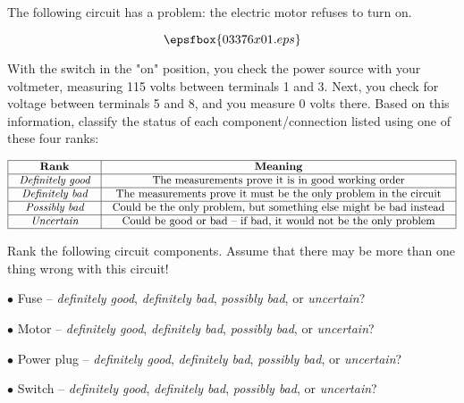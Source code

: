 

The following circuit has a problem: the electric motor refuses to turn on.

$$\epsfbox{03376x01.eps}$$

With the switch in the "on" position, you check the power source with your voltmeter, measuring 115 volts between terminals 1 and 3.  Next, you check for voltage between terminals 5 and 8, and you measure 0 volts there.  Based on this information, classify the status of each component/connection listed using one of these four ranks:


$$\vbox{\offinterlineskip
\halign{\strut
\vrule \quad\hfil # \ \hfil & 
\vrule \quad\hfil # \ \hfil \vrule \cr
\noalign{\hrule}
%
{\bf Rank} & {\bf Meaning} \cr
%
\noalign{\hrule}
%
{\it Definitely good} & The measurements prove it is in good working order \cr
%
\noalign{\hrule}
%
{\it Definitely bad} & The measurements prove it must be the only problem in the circuit \cr
%
\noalign{\hrule}
%
{\it Possibly bad} & Could be the only problem, but something else might be bad instead \cr
%
\noalign{\hrule}
%
{\it Uncertain} & Could be good or bad -- if bad, it would not be the only problem \cr
%
\noalign{\hrule}
} %
}$$ %

Rank the following circuit components.  Assume that there may be more than one thing wrong with this circuit!

\medskip
\item{$\bullet$} Fuse -- {\it definitely good}, {\it definitely bad}, {\it possibly bad}, or {\it uncertain}?
\item{$\bullet$} Motor -- {\it definitely good}, {\it definitely bad}, {\it possibly bad}, or {\it uncertain}?
\item{$\bullet$} Power plug -- {\it definitely good}, {\it definitely bad}, {\it possibly bad}, or {\it uncertain}?
\item{$\bullet$} Switch -- {\it definitely good}, {\it definitely bad}, {\it possibly bad}, or {\it uncertain}?
\medskip






